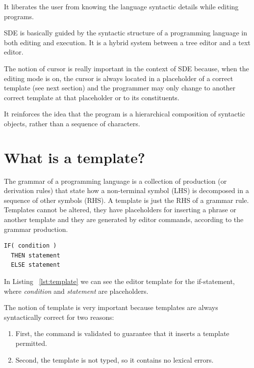 \documentclass[
  oneside,
  11pt, a4paper,
  footinclude=true,
  headinclude=true,
  cleardoublepage=empty
]{scrbook}
\begin{document}
It liberates the user from knowing the language syntactic details while editing programs.

SDE is basically guided by the syntactic structure of a programming language in both editing and execution. It is a hybrid system between a tree editor and a text editor.

The notion of cursor is really important in the context of SDE because, when the editing mode is on, the cursor is always located in a placeholder of a correct template (see next section) and the programmer may only change to another correct template at that placeholder or to its constituents.%

It reinforces the idea that the program is a hierarchical composition of syntactic objects, rather than a sequence of characters.

\section {What is a template?}

The grammar of a programming language is a collection of production (or derivation rules) that state how a non-terminal symbol (LHS) is decomposed in a sequence of other symbols (RHS). A template is just the RHS of a grammar rule.
Templates cannot be altered, they have placeholders for inserting a phrase or another template and they are generated by editor commands, according to the grammar production. %


\begin{lstlisting}[caption={Example of a IF Conditional template},label={lst:template}]
IF( condition )
  THEN statement
  ELSE statement
\end{lstlisting}

In Listing ~\ref{lst:template} we can see the editor template for the if-statement, where \textit{condition} and \textit{statement} are placeholders.

The notion of template is very important because templates are always syntactically correct for two reasons:

\begin{enumerate}
  \item First, the command is validated to guarantee that it inserts a template permitted. %

  \item Second, the template is not typed, so it contains no lexical errors.

\end{enumerate}
\end{document}
